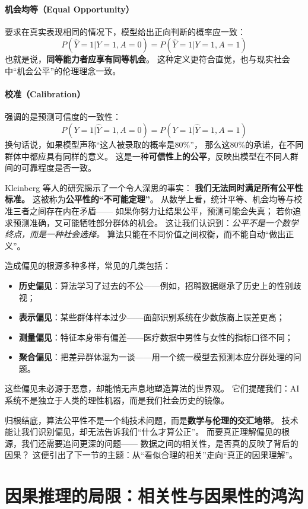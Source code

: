 \paragraph{机会均等（Equal Opportunity）}  
要求在真实表现相同的情况下，模型给出正向判断的概率应一致：  
$$P(\hat{Y}=1|Y=1,A=0)=P(\hat{Y}=1|Y=1,A=1)$$  
也就是说，\textbf{同等能力者应享有同等机会}。  
这种定义更符合直觉，也与现实社会中“机会公平”的伦理理念一致。

\paragraph{校准（Calibration）}  
强调的是预测可信度的一致性：  
$$P(Y=1|\hat{Y}=1,A=0)=P(Y=1|\hat{Y}=1,A=1)$$  
换句话说，如果模型声称“这人被录取的概率是80\%”，  
那么这80\%的承诺，在不同群体中都应具有同样的意义。  
这是一种\textbf{可信性上的公平}，反映出模型在不同人群间的可靠程度是否一致。

Kleinberg 等人的研究揭示了一个令人深思的事实：  
\textbf{我们无法同时满足所有公平性标准。}  
这被称为\textbf{公平性的“不可能定理”}。  
从数学上看，统计平等、机会均等与校准三者之间存在内在矛盾——  
如果你努力让结果公平，预测可能会失真；  
若你追求预测准确，又可能牺牲部分群体的机会。  
这让我们认识到：\textit{公平不是一个数学终点，而是一种社会选择。}  
算法只能在不同价值之间权衡，而不能自动“做出正义”。

造成偏见的根源多种多样，常见的几类包括：  
\begin{itemize}
\item \textbf{历史偏见}：算法学习了过去的不公——例如，招聘数据继承了历史上的性别歧视；  
\item \textbf{表示偏见}：某些群体样本过少——面部识别系统在少数族裔上误差更高；  
\item \textbf{测量偏见}：特征本身带有偏差——医疗数据中男性与女性的指标口径不同；  
\item \textbf{聚合偏见}：把差异群体混为一谈——用一个统一模型去预测本应分群处理的问题。  
\end{itemize}
这些偏见未必源于恶意，却能悄无声息地塑造算法的世界观。  
它们提醒我们：AI系统不是独立于人类的理性机器，而是我们社会历史的镜像。

归根结底，算法公平性不是一个纯技术问题，而是\textbf{数学与伦理的交汇地带}。  
技术能让我们识别偏见，却无法告诉我们“什么才算公正”。  
而要真正理解偏见的根源，我们还需要追问更深的问题——  
数据之间的相关性，是否真的反映了背后的因果？  
这便引出了下一节的主题：从“看似合理的相关”走向“真正的因果理解”。

\section{因果推理的局限：相关性与因果性的鸿沟}

